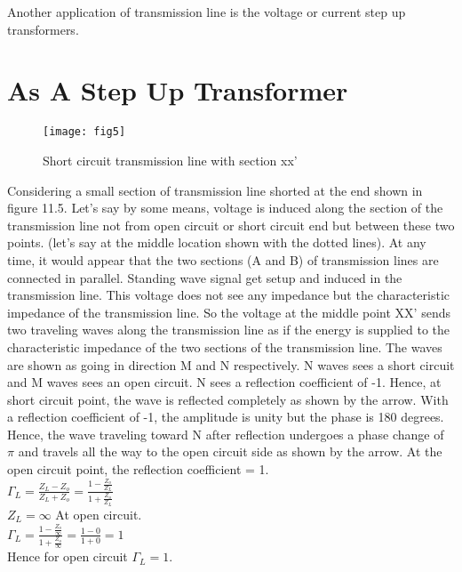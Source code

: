   Another application of transmission line is the voltage or current step up transformers.
  
  \section{As A Step Up Transformer}
  \begin{figure}[h]
  	\centering
  	\texttt{[image: fig5]}
  	\caption{Short circuit transmission line with section xx'}
  
  \end{figure}
 Considering a small section of transmission line shorted at the end shown in figure 11.5. Let's say  by some  means,  voltage  is induced along the section of the  transmission line not from open circuit  or short circuit  end  but between  these  two  points.
  (let's say at the middle location shown  with  the dotted lines). At any time, it would appear that the two sections (A and B) of transmission lines are connected in parallel. Standing wave signal get setup and induced in the transmission line. This voltage does not see any impedance but the characteristic impedance of the transmission line. So the voltage  at the middle  point XX' sends two traveling waves along the transmission line as if the  energy is supplied to the characteristic impedance of the two sections of the transmission line. The waves are shown  as going in direction M and N respectively. N waves  sees a short circuit and M waves  sees  an open circuit. N sees a reflection  coefficient  of -1. Hence, at short circuit point, the wave is reflected completely as shown  by the arrow. With a reflection coefficient of -1, the amplitude is unity but the phase is 180 degrees. Hence, the wave  traveling toward N after reflection undergoes a phase change of $\pi$ and travels all the way to the open circuit  side as shown by the arrow. At the open circuit point, the reflection coefficient = 1.\\
  
  $ \Gamma_{L} = \frac{Z_{L} - Z_{o}}{Z_{L} + Z_{o}} =  \frac{1 - \frac{Z_{o}}{Z_{L}}}{1 + \frac{Z_{o}}{Z_{L}}}$\\
  
  $ Z_{L} = \infty $ At open circuit.\\
  
   $ \Gamma_{L} =  \frac{1 - \frac{Z_{o}}\infty}{1 + \frac{Z_{o}}\infty} = \frac{1 - 0}{1 + 0} = 1$\\
   
   
  Hence for open circuit $\Gamma_{L} = 1 $.\\
  
